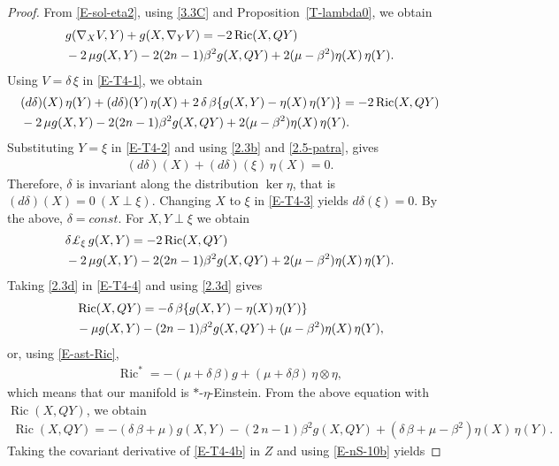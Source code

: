 \documentclass[11pt,a4paper,twoside]{article}
\def\Ric{\operatorname{Ric}}
\begin{document}
{\begin{proof}
From \eqref{E-sol-eta2}, using \eqref{3.3C} and Proposition~\ref{T-lambda0}, we obtain
\begin{align}\label{E-T4-1}
\notag
 & g(\nabla_X V, Y) + g(X, \nabla_Y V) = - 2\Ric(X,QY) \\
 & - 2\,\mu g(X,Y) - 2(2n-1)\beta^2 g(X,QY) + 2(\mu-\beta^2)\eta(X)\,\eta(Y) .
\end{align}
Using $V=\delta\,\xi$ in \eqref{E-T4-1}, we obtain
\begin{align}\label{E-T4-2}
\notag
 & (d\delta)(X)\,\eta(Y) + (d\delta)(Y)\,\eta(X)
 + 2\,\delta\,\beta\{g(X,Y) - \eta(X)\,\eta(Y)\}
 = - 2\Ric(X,QY) \\
 & - 2\,\mu g(X,Y) - 2(2n-1)\beta^2 g(X,QY) + 2(\mu-\beta^2)\eta(X)\,\eta(Y) .
\end{align}
Substituting $Y=\xi$ in \eqref{E-T4-2} and using \eqref{2.3b} and \eqref{2.5-patra}, gives
\begin{align}\label{E-T4-3}
 (d\delta)(X) + (d\delta)(\xi)\,\eta(X) = 0 .
\end{align}
Therefore, $\delta$ is invariant along the distribution
$\ker\eta$, that is $(d\delta)(X)=0\ (X\perp\xi)$.
Changing $X$ to $\xi$ in \eqref{E-T4-3} yields $d\delta(\xi)=0$.
By the above, $\delta=const$. For $X,Y\perp\xi$ we obtain
\begin{align}\label{E-T4-4}
\notag
 & \delta \pounds_\xi\,g(X,Y) = - 2\Ric(X,QY) \\
 & - 2\,\mu g(X,Y) - 2(2n-1)\beta^2 g(X,QY) + 2(\mu-\beta^2)\eta(X)\,\eta(Y) .
\end{align}
Taking \eqref{2.3d} in \eqref{E-T4-4} and using \eqref{2.3d} gives
\begin{align*}
\notag
 & \Ric(X,QY) = -\delta\,\beta\{g(X,Y)-\eta(X)\,\eta(Y)\} \\
 & - \mu g(X,Y) - (2n-1)\beta^2 g(X,QY) + (\mu-\beta^2)\eta(X)\,\eta(Y) ,
\end{align*}
or, using \eqref{E-ast-Ric},
\begin{align*}%
 \Ric^\ast = -(\mu+\delta\,\beta) g + (\mu + \delta\beta)\,\eta\otimes\eta,
\end{align*}
which means that our manifold is $\ast$-$\eta$-Einstein.
From the above equation with $\Ric(X,QY)$, we obtain
\begin{align}\label{E-T4-4b}
 \Ric(X,QY) = -(\delta\,\beta+\mu) g(X,Y) -(2\,n-1)\beta^2 g(X,QY) +(\delta\,\beta+\mu-\beta^2)\eta(X)\,\eta(Y) .
\end{align}
Taking the covariant derivative of \eqref{E-T4-4b} in $Z$ and using \eqref{E-nS-10b} yields

\end{proof}}
\end{document}
